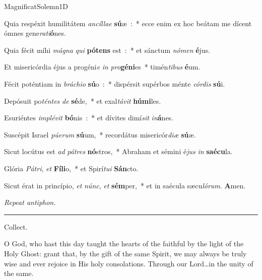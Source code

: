 \documentclass[letterpaper,12pt]{article} %
\begin{document}
{\greblockcustos{}
\begin{magnificat}{MagnificatSolemn1D}
\normalsize
\item \vspace{-3ex} Quia respéxit humilitátem \emph{an}\emph{cíl}\emph{lae} \textbf{sú}æ~:~* ecce enim ex hoc beátam me dícent ómnes gene\emph{ra}\emph{ti}\textbf{ó}nes.
\item Quia fécit míhi \emph{má}\emph{gna} \emph{qui} \textbf{pó}\textbf{tens} est~:~* et sánctum \emph{nó}\emph{men} \textbf{é}jus.
\item Et misericórdia éjus a progéni\emph{e} \emph{in} \emph{pro}\textbf{gé}\textbf{ni}es~* timén\emph{ti}\emph{bus} \textbf{é}um.
\item Fécit poténtiam in \emph{brá}\emph{chi}\emph{o} \textbf{sú}o~:~* dispérsit supérbos ménte \emph{cór}\emph{dis} \textbf{sú}i.
\item Depósuit po\emph{tén}\emph{tes} \emph{de} \textbf{sé}de,~* et exal\emph{tá}\emph{vit} \textbf{hú}\textbf{mi}les.
\item Esuriéntes \emph{im}\emph{plé}\emph{vit} \textbf{bó}nis~:~* et dívites dimí\emph{sit} \emph{in}\textbf{á}nes.
\item Suscépit Israel \emph{pú}\emph{e}\emph{rum} \textbf{sú}um,~* recordátus misericór\emph{di}\emph{æ} \textbf{sú}æ.
\item Sicut locútus est \emph{ad} \emph{pá}\emph{tres} \textbf{nó}stros,~* Abraham et sémini é\emph{jus} \emph{in} \textbf{saé}\textbf{cu}la.
\item Glória \emph{Pá}\emph{tri}, \emph{et} \textbf{Fí}\textbf{li}o,~* et Spirí\emph{tu}\emph{i} \textbf{Sán}cto.
\item Sicut érat in princípio, \emph{et} \emph{núnc}, \emph{et} \textbf{sém}per,~* et in saécula sæcu\emph{ló}\emph{rum}. \textbf{A}men.
\end{magnificat}

{\noindent\emph{Repeat antiphon.}\\}

}
\hrule
\smallskip
\begin{center}{\large Collect.}\end{center}
\begin{parcolumns}[rulebetween]{2}
\sloppy
{}
{O God, who hast this day taught the hearts of the faithful by the light of the Holy Ghost: grant that, by the gift of the same Spirit, we may always be truly wise and ever rejoice in His holy consolations. Through our Lord\ldots in the unity of the same.}
\end{parcolumns}
\bigskip
\end{document}

